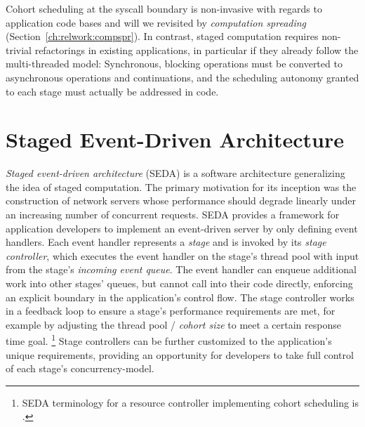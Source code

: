 \documentclass[12pt,a4paper]{book}
\begin{document}
Cohort scheduling at the syscall boundary is non-invasive with regards to application code bases and will we revisited by \emph{computation spreading} (Section~\ref{ch:relwork:compspr}).
In contrast, staged computation requires non-trivial refactorings in existing applications, in particular if they already follow the multi-threaded model:
Synchronous, blocking operations must be converted to asynchronous operations and continuations, and the scheduling autonomy granted to each stage must actually be addressed in code.

\section{Staged Event-Driven Architecture}\label{ch:relwork:seda}
\emph{Staged event-driven architecture} (SEDA) is a software architecture generalizing the idea of staged computation.
The primary motivation for its inception was the construction of network servers whose performance should degrade linearly under an increasing number of concurrent requests.
SEDA provides a framework for application developers to implement an event-driven server by only defining event handlers.
Each event handler represents a \emph{stage} and is invoked by its \emph{stage controller}, which executes the event handler on the stage's thread pool with input from the stage's \emph{incoming event queue}.
The event handler can enqueue additional work into other stages' queues, but cannot call into their code directly, enforcing an explicit boundary in the application's control flow.
The stage controller works in a feedback loop to ensure a stage's performance requirements are met, for example by adjusting the thread pool / \emph{cohort size} to meet a certain response time goal.%
\footnote{SEDA terminology for a resource controller implementing cohort scheduling is .}
Stage controllers can be further customized to the application's unique requirements, providing an opportunity for developers to take full control of each stage's concurrency-model.~\cite{seda}
\end{document}
